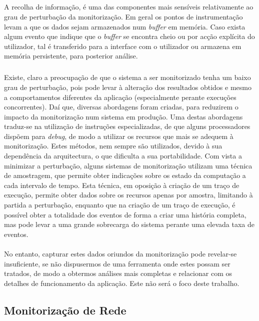 \subparagraph*{
}
A recolha de informação, é uma das componentes mais sensíveis relativamente ao grau de perturbação da monitorização.
Em geral os pontos de instrumentação levam a que os dados sejam armazenados num \textit{buffer} em memória.
Caso exista algum evento que indique que o \textit{buffer} se encontra cheio ou por acção explícita do utilizador, tal é transferido para a interface com o utilizador ou armazena em memória persistente, para posterior análise.

\subparagraph*{
}
Existe, claro a preocupação de que o sistema a ser monitorizado tenha um baixo grau de perturbação, pois pode levar à alteração dos resultados obtidos e mesmo a comportamentos diferentes da aplicação (especialmente perante execuções concorrentes).
Daí que, diversas abordagens foram criadas, para reduzirem o impacto da monitorização num sistema em produção.
Uma destas abordagens traduz-se na utilização de instruções especializadas, de que alguns processadores dispõem para \textit{debug}, de modo a utilizar os recursos que mais se adequem à monitorização.
Estes métodos, nem sempre são utilizados, devido à sua dependência da arquitectura, o que dificulta a sua portabilidade.
Com vista a minimizar a perturbação, alguns sistemas de monitorização utilizam uma técnica de amostragem, que permite obter indicações sobre os estado da computação a cada intervalo de tempo.
Esta técnica, em oposição à criação de um traço de execução, permite obter dados sobre os recursos apenas por amostra, limitando à partida a perturbação, enquanto que na criação de um traço de execução, é possível obter a totalidade dos eventos de forma a criar uma história completa, mas pode levar a uma grande sobrecarga do sistema perante uma elevada taxa de eventos.

\paragraph*{
}
No entanto, capturar estes dados oriundos da monitorização pode revelar-se insuficiente, se não dispusermos de uma ferramenta onde estes possam ser tratados, de modo a obtermos análises mais completas e relacionar com os detalhes de funcionamento da aplicação.
Este não será o foco deste trabalho.

\subsection{Monitorização de Rede}\label{sub:network_monitoring}

